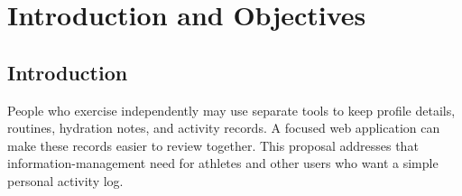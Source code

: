 \documentclass[11pt,a4paper]{report}
\begin{document}



\clearpage
\tableofcontents
\small
\listoffigures
\listoftables
\normalsize
\clearpage
{}

\chapter{Introduction and Objectives}

\section{Introduction}
People who exercise independently may use separate tools to keep profile details, routines, hydration notes, and activity records. A focused web application can make these records easier to review together. This proposal addresses that information-management need for athletes  and other users who want a simple personal activity log.
\end{document}
